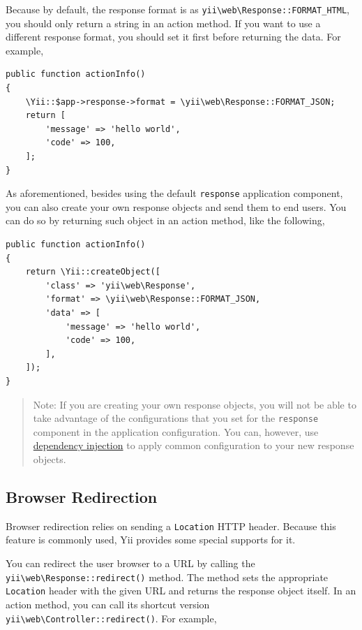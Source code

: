 Because by default, the response format is as \texttt{yii{\allowbreak{}\textbackslash}web{\allowbreak{}\textbackslash}Response\allowbreak{}::\allowbreak{}FORMAT\_HTML}, you should only return a string
in an action method. If you want to use a different response format, you should set it first before returning the data.
For example,

\lstset{language=php}\begin{lstlisting}
public function actionInfo()
{
    \Yii::$app->response->format = \yii\web\Response::FORMAT_JSON;
    return [
        'message' => 'hello world',
        'code' => 100,
    ];
}
\end{lstlisting}
As aforementioned, besides using the default \lstinline|response| application component, you can also create your own
response objects and send them to end users. You can do so by returning such object in an action method, like the following,

\lstset{language=php}\begin{lstlisting}
public function actionInfo()
{
    return \Yii::createObject([
        'class' => 'yii\web\Response',
        'format' => \yii\web\Response::FORMAT_JSON,
        'data' => [
            'message' => 'hello world',
            'code' => 100,
        ],
    ]);
}
\end{lstlisting}
\begin{quote}Note: If you are creating your own response objects, you will not be able to take advantage of the configurations
  that you set for the \lstinline|response| component in the application configuration. You can, however, use 
  \hyperref[concept-di-container.md]{dependency injection} to apply common configuration to your new response objects.

\end{quote}
\subsection{Browser Redirection \label{runtime-responses.md::browser-redirection}}
Browser redirection relies on sending a \lstinline|Location| HTTP header. Because this feature is commonly used, Yii provides
some special supports for it.

You can redirect the user browser to a URL by calling the \texttt{yii{\allowbreak{}\textbackslash}web{\allowbreak{}\textbackslash}Response\allowbreak{}::\allowbreak{}redirect()} method. The method
sets the appropriate \lstinline|Location| header with the given URL and returns the response object itself. In an action method,
you can call its shortcut version \texttt{yii{\allowbreak{}\textbackslash}web{\allowbreak{}\textbackslash}Controller\allowbreak{}::\allowbreak{}redirect()}. For example,

